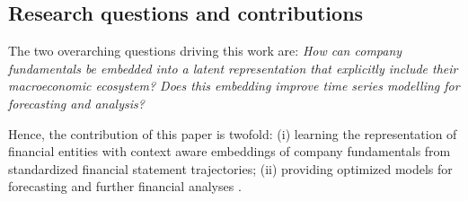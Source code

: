 \documentclass[a4paper,fleqn]{cas-dc}
\begin{document}


\subsection{Research questions and contributions}

The two overarching questions driving this work are: \textit{How can company fundamentals be embedded into a latent representation that explicitly include their macroeconomic ecosystem? Does this embedding improve time series modelling for forecasting and analysis?}

Hence, the contribution of this paper is twofold: (i) learning the representation of financial entities with context aware embeddings of company fundamentals from standardized financial statement trajectories; (ii) providing optimized models for forecasting and further financial analyses \citep{amel-zadeh_machine_2020,pamuk_opening_2023,divo_forecasting_2025,stock_embedding_2022}.
\end{document}
